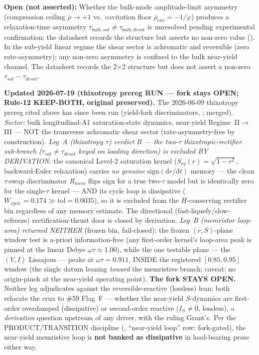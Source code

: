 \noindent
\textbf{Open (not asserted):} Whether the bulk-mode amplitude-limit asymmetry (compression ceiling $\bar{\rho}\to+1$ vs.\ cavitation floor $\bar{\rho}_{cav}=-1/\varphi$) produces a relaxation-time asymmetry $\tau_{bulk,sat} \neq \tau_{bulk,desat}$ is unresolved pending experimental confirmation; the datasheet records the structure but asserts no non-zero value (). In the sub-yield linear regime the shear sector is achromatic and reversible (zero rate-asymmetry); any non-zero asymmetry is confined to the bulk near-yield channel. The datasheet records the 2$\times$2 structure but does not assert a non-zero $\tau_{sat}-\tau_{desat}$.

\medskip\noindent
\textbf{Updated 2026-07-19 (thixotropy prereg RUN --- fork stays OPEN; Rule-12 KEEP-BOTH, original preserved).} The 2026-06-09 thixotropy prereg cited above has since been run (yield-fork discriminators, ; merged). \emph{Sector:} bulk longitudinal-A1 saturation-state dynamics, near-yield Regime~II$\to$III --- NOT the transverse achromatic shear sector (rate-asymmetry-free by construction). \emph{Leg~A (thixotropy $\tau$) verdict B --- the two-$\tau$ thixotropic-rectifier sub-branch ($\tau_{sat}\neq\tau_{desat}$ keyed on loading direction) is excluded BY DERIVATION:} the canonical Level-2 saturation kernel ($S_{eq}(r)=\sqrt{1-r^2}$, backward-Euler relaxation) carries \emph{no genuine} $\mathrm{sign}(\mathrm{d}r/\mathrm{d}t)$ memory --- the clean $\tau$-swap discriminator $R_{mem}$ flips sign for a true two-$\tau$ model but is identically zero for the single-$\tau$ kernel --- AND its cycle loop is dissipative ($W_{cycle}=0.174 \gg \mathrm{tol}=0.0035$), so it is excluded from the $H$-conserving rectifier bin regardless of any memory estimate. The directional (fast-liquefy/slow-refreeze) rectification-thrust door is closed by derivation. \emph{Leg~B (memristor loop-area) returned NEITHER} (frozen bin, fail-closed): the frozen $(r,S)$-plane window test is a-priori information-free (any first-order kernel's loop-area peak is pinned at the linear Debye $\omega\tau\approx1.00$), while the one testable plane --- the $(V,I)$ Lissajous --- peaks at $\omega\tau=0.911$, INSIDE the registered $[0.85,0.95]$ window (the single datum leaning \emph{toward} the memristive branch; caveat: no origin-pinch at the near-yield operating point). \textbf{The fork STAYS OPEN.} Neither leg adjudicates against the reversible-reactive (lossless) lean; both relocate the crux to \#59 Flag~F --- whether the near-yield $S$-dynamics are first-order overdamped (dissipative) or second-order reactive ($I_S\neq0$, lossless), a \emph{derivation} question upstream of any driver, with the ruling Grant's. Per the PRODUCT/TRANSITION discipline (, ``near-yield loop'' row: fork-gated), the near-yield memristive loop is \textbf{not banked as dissipative} in load-bearing prose either way.

